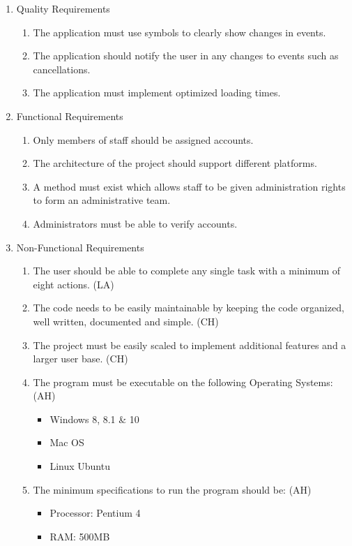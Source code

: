 \documentclass[a4paper]{article}
\begin{document}
\begin{enumerate}
  \item Quality Requirements
  \begin{enumerate}[label=Q\arabic*.]
    \item The application must use symbols to clearly show changes in events.
    \item The application should notify the user in any changes to events such as cancellations.
    \item The application must implement optimized loading times.
  \end{enumerate}
  \item Functional Requirements
  \begin{enumerate}[label=F\arabic*.]
    \item Only members of staff should be assigned accounts.
    \item The architecture of the project should support different platforms.
    \item A method must exist which allows staff to be given administration rights to form an administrative team.
    \item Administrators must be able to verify accounts.
  \end{enumerate}
  \item Non-Functional Requirements
  \begin{enumerate}[label=NF\arabic*.]
  	  \item The user should be able to complete any single task with a minimum of eight actions. (LA)
      \item The code needs to be easily maintainable by keeping the code organized, well written, documented and simple. (CH)
      \item The project must be easily scaled to implement additional features and a larger user base. (CH) %
      \item The program must be executable on the following Operating Systems: (AH) \begin{itemize}
        \item Windows 8, 8.1 \& 10
        \item Mac OS
        \item Linux Ubuntu
      \end{itemize}
      \item The minimum specifications to run the program should be: (AH) \begin{itemize}
        \item Processor: Pentium 4
        \item RAM: 500MB

\end{itemize}
\end{enumerate}
\end{enumerate}
\end{document}
